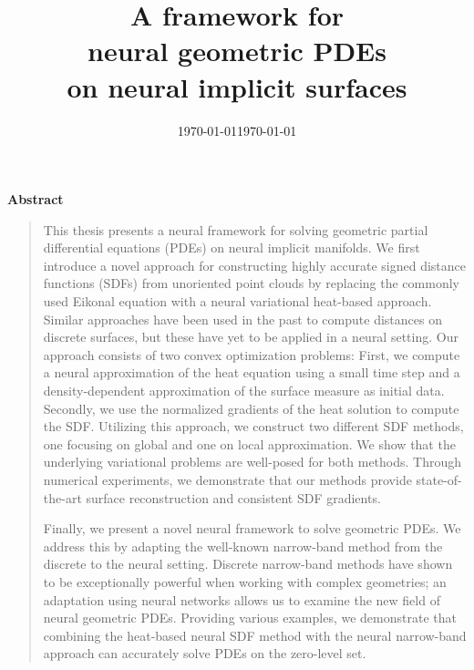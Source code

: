 \documentclass[12pt,openany]{book}
\date{\today}
\title{A framework for \\ neural geometric PDEs\\on neural implicit surfaces}
\date{\today}
\theoremstyle{plainnormal}
\newenvironment{abstract}{
  \cleardoublepage
  \null\vfill
  \begin{center}\bfseries Abstract\end{center}
  \begin{quote}
}{
  \end{quote}
  \vfill\null
  \cleardoublepage
}
\theoremstyle{remark}
\begin{document}
\pagestyle{empty}

\maketitle

\pagestyle{headings}
\setcounter{page}{5}

\begingroup
\let\clearpage\relax

\begin{abstract}
This thesis presents a neural framework for solving geometric partial differential equations (PDEs) on neural implicit manifolds. We first introduce a novel approach for constructing highly accurate signed distance functions (SDFs) from unoriented point clouds by replacing the commonly used Eikonal equation with a neural variational heat-based approach. Similar approaches have been used in the past to compute distances on discrete surfaces, but these have yet to be applied in a neural setting. Our approach consists of two convex optimization problems: First, we compute a neural approximation of the heat equation using a small time step and a density-dependent approximation of the surface measure as initial data. Secondly, we use the normalized gradients of the heat solution to compute the SDF. Utilizing this approach, we construct two different SDF methods, one focusing on global and one on local approximation. We show that the underlying variational problems are well-posed for both methods.
Through numerical experiments, we demonstrate that our methods provide state-of-the-art surface reconstruction and consistent SDF gradients.\par
Finally, we present a novel neural framework to solve geometric PDEs. We address this by adapting the well-known narrow-band method from the discrete to the neural setting. Discrete narrow-band methods have shown to be exceptionally powerful when working with complex geometries; an adaptation using neural networks allows us to examine the new field of neural geometric PDEs. Providing various examples, we demonstrate that combining the heat-based neural SDF method with the neural narrow-band approach can accurately solve PDEs on the zero-level set.
\end{abstract}
\end{document}
